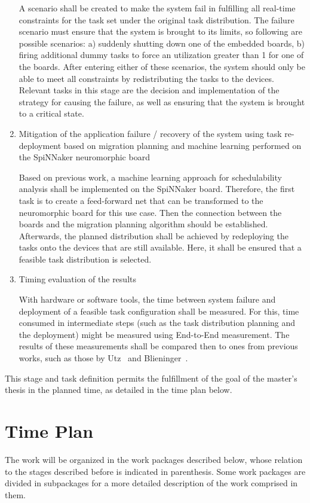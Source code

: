 \begin{enumerate}
A scenario shall be created to make the system fail in fulfilling all real-time constraints for the task set under the original task distribution. The failure scenario must ensure that the system is brought to its limits, so following are possible scenarios: a) suddenly shutting down one of the embedded boards, b) firing additional dummy tasks to force an utilization greater than 1 for one of the boards. After entering either of these scenarios, the system should only be able to meet all constraints by redistributing the tasks to the devices. Relevant tasks in this stage are the decision and implementation of the strategy for causing the failure, as well as ensuring that the system is brought to a critical state.

\item	Mitigation of the application failure / recovery of the system using task re-deployment based on migration planning and machine learning performed on the SpiNNaker neuromorphic board

Based on previous work, a machine learning approach for schedulability analysis shall be implemented on the SpiNNaker board. Therefore, the first task is to create a feed-forward net that can be transformed to the neuromorphic board for this use case. Then the connection between the boards and the migration planning algorithm should be established. Afterwards, the planned distribution shall be achieved by redeploying the tasks onto the devices that are still available. Here, it shall be ensured that a feasible task distribution is selected.

\item	Timing evaluation of the results

With hardware or software tools, the time between system failure and deployment of a feasible task configuration shall be measured. For this, time consumed in intermediate steps (such as the task distribution planning and the deployment) might be measured using End-to-End measurement. The results of these measurements shall be compared then to ones from previous works, such as those by Utz~\parencite{utz1} and Blieninger~\parencite{blieninger1}.
\end{enumerate}

This stage and task definition permits the fulfillment of the goal of the master’s thesis in the planned time, as detailed in the time plan below. 

\section*{Time Plan}\label{section:timeplan}
The work will be organized in the work packages described below, whose relation to the stages described before is indicated in parenthesis. Some work packages are divided in subpackages for a more detailed description of the work comprised in them.

